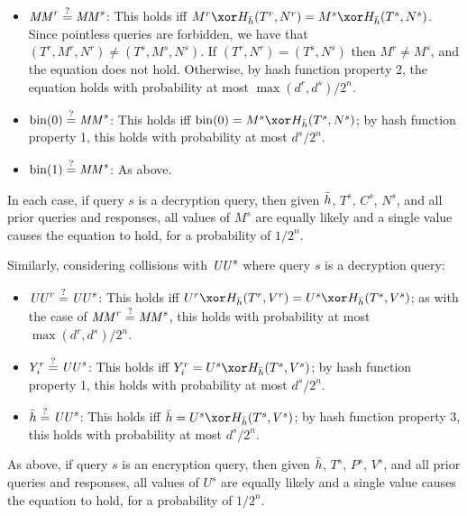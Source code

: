 \documentclass[hctr2.tex]{subfiles}
\begin{document}
\begin{itemize}
    \item \(\mathit{MM}^r \stackrel{\text{?}}{=} \mathit{MM}^s\):
    This holds iff \(M^r \xor H_{\hgen}(T^r, N^r) = M^s \xor H_{\hgen}(T^s, N^s)\).
    Since pointless queries are forbidden,
    we have that \((T^r, M^r, N^r) \neq (T^s, M^s, N^s)\).
    If \((T^r, N^r) = (T^s, N^s)\) then \(M^r \neq M^s\),
    and the equation does not hold.
    Otherwise, by hash function property 2,
    the equation holds with probability at most
    \(\max(d^r, d^s)/2^n\).
    \item \(\operatorname{bin}(0) \stackrel{\text{?}}{=} \mathit{MM}^s\):
    This holds iff \(\fromint(0) = M^s \xor H_{\hgen}(T^s, N^s)\);
    by hash function property 1, this holds with probability at most
    \(d^s/2^n\).
    \item \(\operatorname{bin}(1) \stackrel{\text{?}}{=} \mathit{MM}^s\):
    As above.
\end{itemize}

In each case, if query \(s\) is a decryption query,
then given \(\bar{h}\), \(T^s\), \(C^s\), \(N^s\),
and all prior queries and responses,
all values of \(M^s\) are equally likely 
and a single value causes the equation to hold,
for a probability of \(1/2^n\).

Similarly, considering collisions with \(\mathit{UU}^s\) where
query \(s\) is a decryption query:

\begin{itemize}
    \item \(\mathit{UU}^r \stackrel{\text{?}}{=} \mathit{UU}^s\): 
    This holds iff \(U^r \xor H_{\hgen}(T^r, V^r) = U^s \xor H_{\hgen}(T^s, V^s)\);
    as with the case of \(\mathit{MM}^r \stackrel{\text{?}}{=} \mathit{MM}^s\), 
    this holds with probability at most
    \(\max(d^r, d^s)/2^n\).
    \item \(Y_i^r \stackrel{\text{?}}{=} \mathit{UU}^s\):
    This holds iff \(Y_i^r = U^s \xor H_{\hgen}(T^s, V^s)\);
    by hash function property 1, this holds with probability at most
    \(d^s/2^n\).
    \item \(\bar{h} \stackrel{\text{?}}{=} \mathit{UU}^s\):
    This holds iff \(\hgen = U^s \xor H_{\hgen}(T^s, V^s)\);
    by hash function property 3, this holds with probability at most
    \(d^s/2^n\).
\end{itemize}

As above, if query \(s\) is an encryption query,
then given \(\bar{h}\), \(T^s\), \(P^s\), \(V^s\),
and all prior queries and responses,
all values of \(U^s\) are equally likely
and a single value causes the equation to hold,
for a probability of \(1/2^n\).
\end{document}
